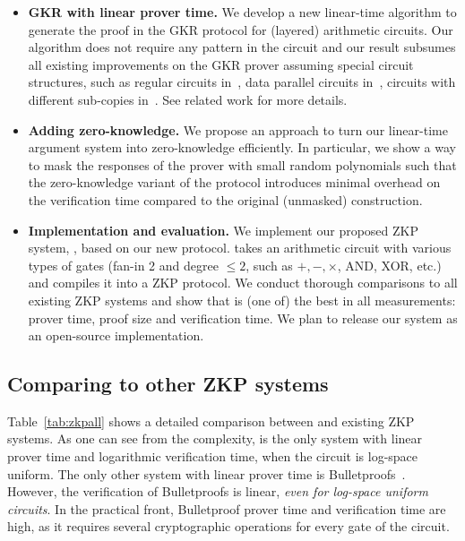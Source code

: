 \begin{itemize}
	\item \textbf{GKR with linear prover time.} We develop a new linear-time algorithm to generate the proof in the GKR protocol for (layered) arithmetic circuits. Our algorithm does not require any pattern in the circuit and our result subsumes all existing improvements on the GKR prover assuming special circuit structures, such as regular circuits in~\cite{t13}, data parallel circuits in~\cite{t13,wahby2017full}, circuits with different sub-copies in~\cite{vram}. See related work for more details. 
	\item \textbf{Adding zero-knowledge.} We propose an approach to turn our linear-time argument system into zero-knowledge efficiently. In particular, we show a way to mask the responses of the prover with small random polynomials such that the zero-knowledge variant of the protocol introduces minimal overhead on the verification time compared to the original (unmasked) construction. 
	\item \textbf{Implementation and evaluation.}  We implement our proposed ZKP system, \name, based on our new protocol. \name takes an arithmetic circuit with various types of gates (fan-in 2 and degree $\le 2$, such as $+,-,\times$, AND, XOR, etc.) and compiles it into a ZKP protocol. We conduct thorough comparisons to all existing ZKP systems and show that \name is (one of) the best in all measurements: prover time, proof size and verification time. We plan to release our system as an open-source implementation.

\end{itemize}

\subsection{Comparing to other ZKP systems} Table~\ref{tab:zkpall} shows a detailed comparison between \name and existing ZKP systems. As one can see from the complexity, \name is the only system with linear prover time and logarithmic verification time, when the circuit is log-space uniform. 
The only other system with linear prover time is Bulletproofs~\cite{bulletproofs}. However, the verification of Bulletproofs is linear, \emph{even for log-space uniform circuits}. In the practical front, Bulletproof prover time and verification time are high, as it requires several cryptographic operations for every gate of the circuit.

